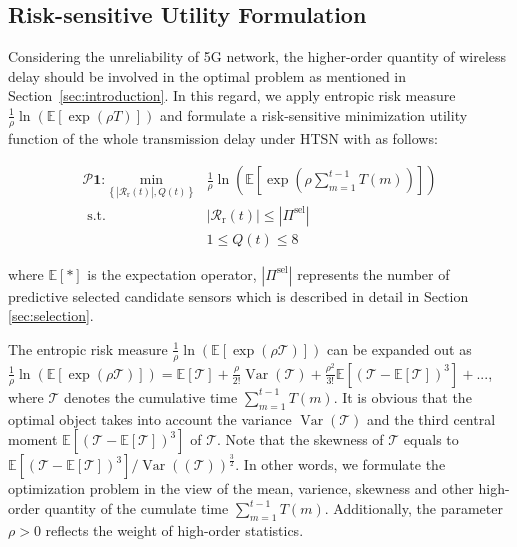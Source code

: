 \documentclass{SCIS2021}
\begin{document}
	\subsection{Risk-sensitive Utility Formulation} 
	\label{ssec:risk-sensitive problem}
	Considering the unreliability of 5G network, the higher-order quantity of wireless delay should be involved in the optimal problem as mentioned in Section~\ref{sec:introduction}. In this regard, we apply entropic risk measure $\frac{1}{\rho} \ln \left(\mathbb{E}\left[\exp \left(\rho T\right)\right]\right)$ and formulate a risk-sensitive minimization utility function of the whole transmission delay under HTSN with  as follows\cite{bennis2018ultrareliable}:
	
	
	\setlength\abovedisplayskip{-16pt}
	\begin{center}
		\begin{equation}
			\begin{aligned}
				\bm{\mathcal{P}1:} \underset{\left\{\left|\mathcal{R}_\mathrm{r}(t)\right|, Q(t)\right\}}{\mathrm{min}} &\frac{1}{\rho} \ln (\mathbb{E}[\exp (\rho \sum_{m=1}^{t-1} T(m))]) \\
				\text { s.t. } &\left|\mathcal{R}_\mathrm{r}(t)\right| \leq\left| \Pi^\text{sel} \right|  \\
				&1 \leq Q(t) \leq 8
			\end{aligned}
		\end{equation}
	\end{center}
	\setlength\belowdisplayskip{-8pt}
	
	\vspace{-6pt}
	\noindent where $\mathbb{E}[*]$ is the expectation operator, $\left| \Pi^\text{sel} \right|$ represents the number of predictive selected candidate sensors which is described in detail in Section \ref{sec:selection}.
	
	\par The entropic risk measure $\frac{1}{\rho} \ln \left(\mathbb{E}\left[\exp \left(\rho \mathcal{T}\right)\right]\right)$ can be expanded out as $\frac{1}{\rho} \ln (\mathbb{E}[\exp (\rho \mathcal{T})])=\mathbb{E}[\mathcal{T}]+\frac{\rho}{2 !} \operatorname{Var}(\mathcal{T})+\frac{\rho^{2}}{3 !} \mathbb{E}\left[(\mathcal{T}-\mathbb{E}[\mathcal{T}])^{3}\right]+...$, where $\mathcal{T}$ denotes the cumulative time $\sum_{m=1}^{t-1} T(m)$. It is obvious that the optimal object takes into account the variance $\operatorname{Var}(\mathcal{T})$ and the third central moment $\mathbb{E}\left[(\mathcal{T}-\mathbb{E}[\mathcal{T}])^{3}\right]$ of $\mathcal{T}$. Note that the skewness of $\mathcal{T}$ equals to $\mathbb{E}\left[(\mathcal{T}-\mathbb{E}[\mathcal{T}])^{3}\right] / \operatorname{Var}((\mathcal{T}))^{\frac{3}{2}}$. In other words, we formulate the optimization problem in the view of the mean, varience, skewness and other high-order quantity of the cumulate time $\sum_{m=1}^{t-1} T(m)$. Additionally, the parameter $\rho > 0$ reflects the weight of high-order statistics. 
	
\end{document}
